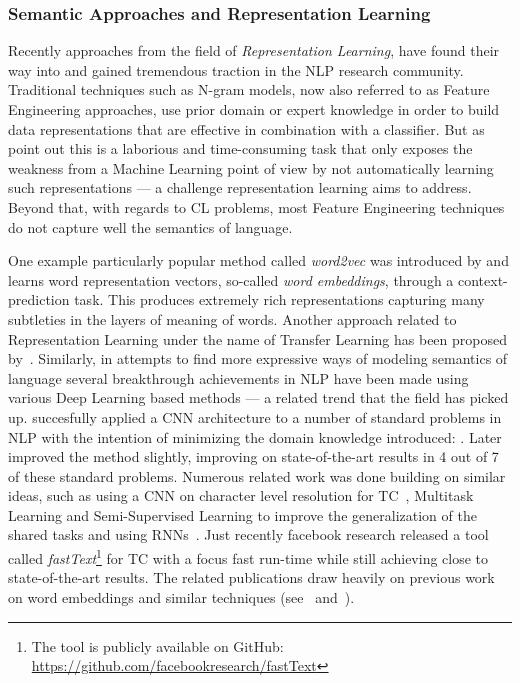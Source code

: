 \subsubsection*{Semantic Approaches and Representation Learning}
\label{subs:Semantic Approaches and Representation Learning}

Recently approaches from the field of \emph{Representation Learning}, have found their way into and gained tremendous traction in the \gls{NLP} research community. Traditional techniques such as N-gram models, now also referred to as \gls{Feature Engineering} approaches, use prior domain or expert knowledge in order to build data representations that are effective in combination with a classifier. But as~\cite{Bengio:2013aa} point out this is a laborious and time-consuming task that only exposes the weakness from a Machine Learning point of view by not automatically learning such representations --- a challenge representation learning aims to address. Beyond that, with regards to \gls{CL} problems, most \gls{Feature Engineering} techniques do not capture well the semantics of language.

One example particularly popular method called \emph{word2vec} was introduced by \cite{Mikolov:2013ad} and learns word representation vectors, so-called \emph{word embeddings}, through a context-prediction task. This produces extremely rich representations capturing many subtleties in the layers of meaning of words\cite{Mikolov:2013ab}. Another approach related to \gls{Representation Learning} under the name of Transfer Learning has been proposed by~\cite{Do:2006aa}. Similarly, in attempts to find more expressive ways of modeling semantics of language several breakthrough achievements in \acrshort{NLP} have been made using various \gls{Deep Learning} based methods --- a related trend that the field has picked up.
\cite{Collobert:2011aa} succesfully applied a \acrfull{CNN} architecture to a number of standard problems in \gls{NLP} with the intention of minimizing the domain knowledge introduced: .
Later~\cite{Kim:2014aa} improved the method slightly, improving on state-of-the-art results in 4 out of 7 of these standard problems. Numerous related work was done building on similar ideas, such as using a \acrshort{CNN} on character level resolution for \gls{TC}~\cite{Zhang:2015aa}, Multitask Learning and Semi-Supervised Learning to improve the generalization of the shared tasks\cite{Collobert:2008aa} and using \glspl{RNN}~\cite{Liu:2016aa}. Just recently facebook research released a tool called \emph{fastText}\footnote{The tool is publicly available on \gls{GitHub}: \url{https://github.com/facebookresearch/fastText}} for \gls{TC} with a focus fast run-time while still achieving close to state-of-the-art results. The related publications draw heavily on previous work on word embeddings and similar techniques (see~\cite{Joulin:2016aa} and~\cite{Bojanowski:2016aa}).

